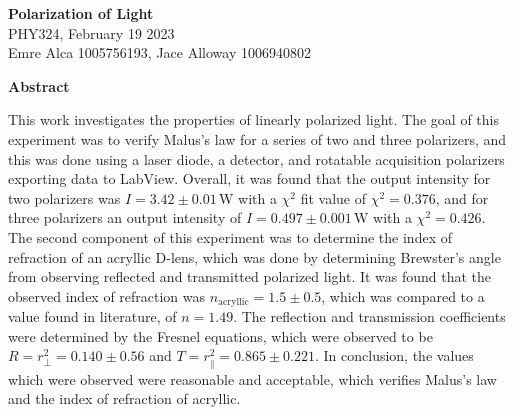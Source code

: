 \documentclass[11pt]{article}
\begin{document}
\begin{center}
    \Large {}  \textbf{Polarization of Light}\\
    \vspace{5pt} 
    \large PHY324, February 19 2023\\
    \vspace{5pt}
    Emre Alca 1005756193, Jace Alloway 1006940802
\end{center}

\nd \hrulefill

\vspace{15pt}



 \selectfont \textbf{Abstract}

 \selectfont 

    This work investigates the properties of linearly polarized light. The goal of this experiment was to verify Malus's law for a series of two and three polarizers, and this was done using a laser diode, a detector, and rotatable acquisition polarizers exporting data to LabView. Overall, it was found that the output intensity for two polarizers was $I = 3.42\pm 0.01\,$W with a $\chi^2$ fit value of $\chi^2= 0.376$, and for three polarizers an output intensity of $I = 0.497\pm0.001\,$W with a $\chi^2 = 0.426$. The second component of this experiment was to determine the index of refraction of an acryllic D-lens, which was done by determining Brewster's angle from observing reflected and transmitted polarized light. It was found that the observed index of refraction was $n_{\text{acryllic}} = 1.5\pm 0.5$, which was compared to a value found in literature, of $n = 1.49$. The reflection and transmission coefficients were determined by the Fresnel equations, which were observed to be $R = r_{\perp}^2 = 0.140\pm 0.56$ and $T = r_{\parallel}^2 = 0.865\pm0.221$. In conclusion, the values which were observed were reasonable and acceptable, which verifies Malus's law and the index of refraction of acryllic.  


\nd \hrulefill

\vspace{5pt}
\end{document}
